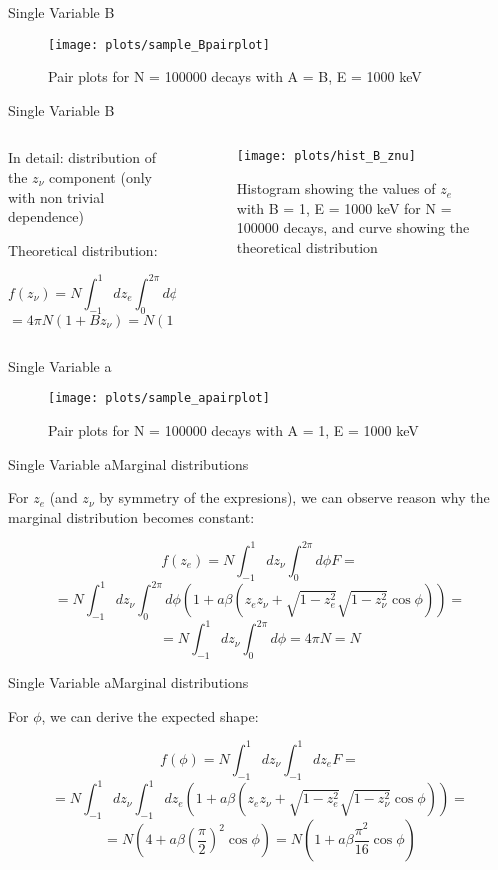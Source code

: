 \documentclass{beamer}
\begin{document}
\begin{frame}{Single Variable B}
	\begin{figure}
		\centering
		\texttt{[image: plots/sample\_Bpairplot]}
		\caption{Pair plots for N = 100000 decays with A = B, E = 1000 keV}
	\end{figure}
\end{frame}
\begin{frame}{Single Variable B}
	\begin{columns}
		\begin{column}{0.425\textwidth}
			In detail: distribution of the $z_\nu$ component (only with non trivial dependence)
			
			Theoretical distribution: 
			
			$$f(z_\nu) = N\int_{-1}^{1}dz_e\int_{0}^{2\pi}d\phi F = $$$$= 4\pi N (1+B z_\nu) = N(1 + B z_\nu)$$
			
		\end{column}
		\begin{column}{0.575\textwidth}
			\begin{figure}
				\centering
				\texttt{[image: plots/hist\_B\_znu]}
				\caption{Histogram showing the values of $z_e$ with B = 1, E = 1000 keV for N = 100000 decays, and curve showing the theoretical distribution}
			\end{figure}
		\end{column}
	\end{columns}
\end{frame}
\begin{frame}{Single Variable a}
	\begin{figure}
		\centering
		\texttt{[image: plots/sample\_apairplot]}
		\caption{Pair plots for N = 100000 decays with A = 1, E = 1000 keV}
	\end{figure}
\end{frame}
\begin{frame}{Single Variable a}{Marginal distributions}

	
	For $z_e$ (and $z_\nu$ by symmetry of the expresions), we can observe reason why the marginal distribution becomes constant: 
	
	$$f(z_e) = N\int_{-1}^{1}dz_\nu\int_{0}^{2\pi}d\phi F =$$$$= N\int_{-1}^{1}dz_\nu\int_{0}^{2\pi}d\phi (1 + a\beta(z_ez_\nu+\sqrt{1-z^2_e}\sqrt{1-z^2_\nu}\cos \phi)) = $$$$ = N\int_{-1}^{1}dz_\nu\int_{0}^{2\pi}d\phi = 4\pi N = N $$

	
\end{frame}
\begin{frame}{Single Variable a}{Marginal distributions}
	
	
	For $\phi$, we can derive the expected shape: 
	
	$$f(\phi) = N\int_{-1}^{1}dz_\nu\int_{-1}^{1}dz_e F =$$$$= N\int_{-1}^{1}dz_\nu\int_{-1}^{1}dz_e (1 + a\beta(z_ez_\nu+\sqrt{1-z^2_e}\sqrt{1-z^2_\nu}\cos \phi)) = $$$$ = N\left(4+a\beta\left(\frac{\pi}{2}\right)^2\cos\phi\right) = N\left(1+a\beta\frac{\pi^2}{16}\cos\phi\right)  $$
	
	
\end{frame}
\end{document}
